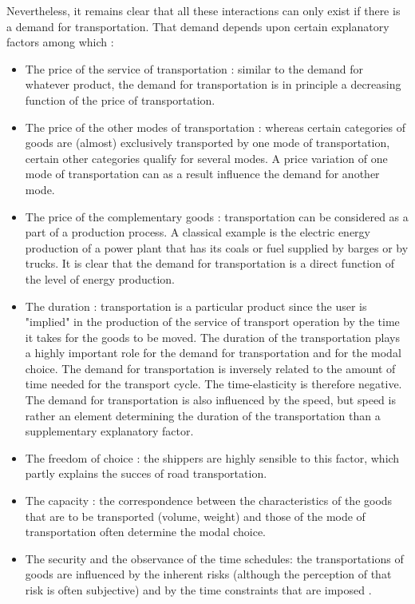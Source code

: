 Nevertheless, it remains clear that all these interactions can only exist if
there is a demand for transportation.  That demand depends upon certain
explanatory factors among which :
\begin{itemize}

\item The price of the service of transportation : similar to the demand for
whatever product, the demand for transportation is in principle a decreasing
function of the price of transportation.

\item The price of the other modes of transportation : whereas certain categories
of goods are (almost) exclusively transported by one mode of transportation,
certain other categories qualify for several modes.  A price variation of one
mode of transportation can as a result influence the demand for another mode.

\item The price of the complementary goods : transportation can be considered
as a part of a production process.  A classical example is the
electric energy production of a power plant that has its coals or
fuel supplied by barges or by trucks.  It is clear that the demand for
transportation is a direct function of the level of energy production.

\item The duration : transportation is a particular product since the
user is "implied" in the production of the service of transport operation by the time
it takes for the goods to be moved.  The duration of the transportation plays a
highly important role for the demand for transportation and for the modal
choice.  The demand for transportation is inversely related to the amount of
time needed for the transport cycle.  The time-elasticity is therefore negative.
The demand for transportation is also influenced by the speed, but speed is
rather an element determining the duration of the transportation than a
supplementary explanatory factor.

\item The freedom of choice : the shippers are highly sensible to this factor,
which partly explains the succes of road transportation.

\item The capacity : the correspondence between the characteristics of the goods that
are to be transported (volume, weight) and those of the mode of transportation
often determine the modal choice.

\item The security and the observance of the time schedules: the transportations of
goods are influenced by the inherent risks (although the perception of that risk is
often subjective) and by the time constraints that are imposed .

\end{itemize}

